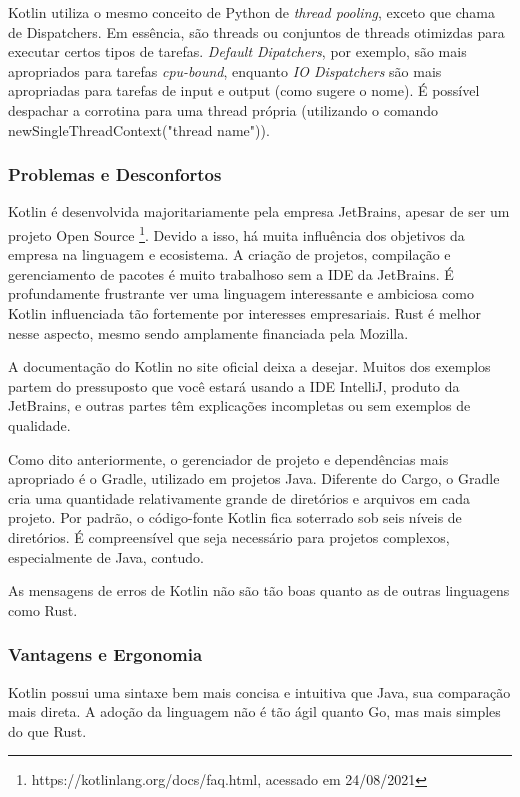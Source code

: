 \documentclass[12pt,a4paper]{article}
\begin{document}
Kotlin utiliza o mesmo conceito de Python de \emph{thread pooling}, exceto que chama de Dispatchers. Em essência, são threads ou conjuntos de threads otimizdas para executar certos tipos de tarefas. \emph{Default Dipatchers}, por exemplo, são mais apropriados para tarefas \emph{cpu-bound}, enquanto \emph{IO Dispatchers} são mais apropriadas para tarefas de input e output (como sugere o nome). É possível despachar a corrotina para uma thread própria (utilizando o comando newSingleThreadContext("thread name")).

\subsubsection{Problemas e Desconfortos}
\label{sssec:kotlin problemas}

Kotlin é desenvolvida majoritariamente pela empresa JetBrains, apesar de ser um projeto Open Source \footnote{https://kotlinlang.org/docs/faq.html, acessado em 24/08/2021}. Devido a isso, há muita influência dos objetivos da empresa na linguagem e ecosistema. A criação de projetos, compilação e gerenciamento de pacotes é muito trabalhoso sem a IDE da JetBrains. É profundamente frustrante ver uma linguagem interessante e ambiciosa como Kotlin influenciada tão fortemente por interesses empresariais. Rust é melhor nesse aspecto, mesmo sendo amplamente financiada pela Mozilla.

A documentação do Kotlin no site oficial deixa a desejar. Muitos dos exemplos partem do pressuposto que você estará usando a IDE IntelliJ, produto da JetBrains, e outras partes têm explicações incompletas ou sem exemplos de qualidade.

Como dito anteriormente, o gerenciador de projeto e dependências mais apropriado é o Gradle, utilizado em projetos Java. Diferente do Cargo, o Gradle cria uma quantidade relativamente grande de diretórios e arquivos em cada projeto. Por padrão, o código-fonte Kotlin fica soterrado sob seis níveis de diretórios. É compreensível que seja necessário para projetos complexos, especialmente de Java, contudo.

As mensagens de erros de Kotlin não são tão boas quanto as de outras linguagens como Rust.

\subsubsection{Vantagens e Ergonomia}
\label{sssec:kotlin vantagens}

Kotlin possui uma sintaxe bem mais concisa e intuitiva que Java, sua comparação mais direta. A adoção da linguagem não é tão ágil quanto Go, mas mais simples do que Rust.
\end{document}
